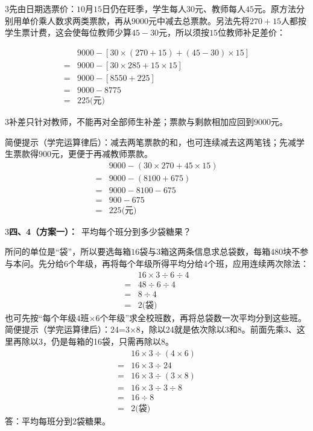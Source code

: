 \documentclass[multi=snippet,border={5bp 20bp 5bp 5bp}]{standalone}
\newenvironment{snippet}[3]{\begin{minipage}{#1bp}\color{answerred}\fontsize{#2}{#3}\selectfont\raggedright}{\end{minipage}}
\begin{document}
\begin{snippet}{505}{11.5}{14}\begin{multicols}{3}\raggedcolumns 先由日期选票价：\(10\)\allowbreak 月\(15\)\allowbreak 日仍在旺季，学生每人\(30\)\allowbreak 元、教师每人\(45\)\allowbreak 元。原方法分别用单价乘人数求两类票款，再从\(9000\)\allowbreak 元中减去总票款。另法先将\(270+15\)\allowbreak 人都按学生票计费，这会使每位教师少算\(45-30\)\allowbreak 元，所以须按\(15\)\allowbreak 位教师补足差价：\end{multicols}\[\begin{aligned}&9000-[30\times(270+15)+(45-30)\times15]\\={}&9000-[30\times285+15\times15]\\={}&9000-[8550+225]\\={}&9000-8775\\={}&225\text{(元)}\end{aligned}\]\begin{multicols}{3}\raggedcolumns 补差只针对教师，不能再对全部师生补差；票款与剩款相加应回到\(9000\)\allowbreak 元。\par 简便提示（学完运算律后）：减去两笔票款的和，也可连续减去这两笔钱；先减学生票款得\(900\)\allowbreak 元，更便于再减教师票款。\[\begin{aligned}&9000-(30\times270+45\times15)\\={}&9000-(8100+675)\\={}&9000-8100-675\\={}&900-675\\={}&225\text{(元)}\end{aligned}\]\end{multicols}\end{snippet}
\begin{snippet}{505}{11.5}{14}\begin{multicols}{3}\raggedcolumns \textbf{四、4（方案一）：}\ 平均每个班分到多少袋糖果？\par 所问的单位是“袋”，所以要选每箱\(16\)\allowbreak 袋与\(3\)\allowbreak 箱这两条信息求总袋数，每箱\(480\)\allowbreak 块不参与本问。先分给\(6\)\allowbreak 个年级，再将每个年级所得平均分给\(4\)\allowbreak 个班，应用连续两次除法：\[\begin{aligned}&16\times3\div6\div4\\={}&48\div6\div4\\={}&8\div4\\={}&2\text{(袋)}\end{aligned}\]也可先按“每个年级\(4\)\allowbreak 班\(\times6\)\allowbreak 个年级”求全校班数，再将总袋数一次平均分到这些班。简便提示（学完运算律后）：24=3×8，除以24就是依次除以3和8。前面先乘3、这里再除以3，仍是每箱的16袋，只需再除以8。\[\begin{aligned}&16\times3\div(4\times6)\\={}&16\times3\div24\\={}&16\times3\div(3\times8)\\={}&16\times3\div3\div8\\={}&16\div8\\={}&2\text{(袋)}\end{aligned}\]答：平均每班分到2袋糖果。\end{multicols}\end{snippet}
\end{document}

